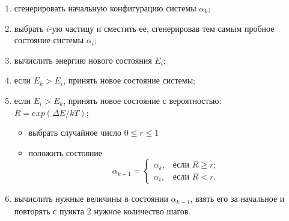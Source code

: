 \documentclass[14pt,a4paper,report]{ncc}
\begin{document}
\vspace{8mm}
\begin{enumerate}
\item сгенерировать начальную конфигурацию системы $\alpha_k$;
\item выбрать $i$-ую частицу и сместить ее, сгенерировав тем самым пробное состояние системы  $\alpha_i$;
\item вычислить энергию нового состояния $E_i$;
\item если $E_k>E_i$, принять новое состояние системы;
\item если $E_i>E_k$, принять новое состояние с вероятностью:\\
$R=exp(\Delta E/kT)$;
\begin{itemize}
\item выбрать случайное число $0\le r\le 1$
\item положить состояние 
\[
\alpha_{k+1}=
\begin{cases}
\alpha_k, & \text{если $R\ge r$;} \\
\alpha_i, & \text{если $R<r$.}
\end{cases}
\]
\end{itemize}
\item вычислить нужные величины в состоянии $\alpha_{k+1}$, взять его за начальное и повторять с пункта 2 нужное количество шагов.
\end{enumerate}


\end{document}
